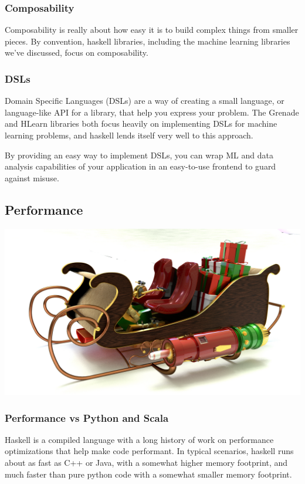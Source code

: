 \documentclass{beamer}
\begin{document}
\begin{frame}
  \frametitle{Composability}
  Composability is really about how easy it is to build complex things
  from smaller pieces.  By convention, haskell libraries, including
  the machine learning libraries we've discussed, focus on
  composability.
\end{frame}

\begin{frame}
  \frametitle{DSLs}
  Domain Specific Languages (DSLs) are a way of creating a small
  language, or language-like API for a library, that help you express
  your problem.  The Grenade and HLearn libraries both focus heavily
  on implementing DSLs for machine learning problems, and haskell
  lends itself very well to this approach.

  By providing an easy way to implement DSLs, you can wrap ML and data
  analysis capabilities of your application in an easy-to-use frontend
  to guard against misuse.
\end{frame}

\subsection{Performance}

\begin{frame}[fragile]
  \begin{center}
    \includegraphics[width=.85\paperwidth]{images/santa.jpg}
  \end{center}
\end{frame}

\begin{frame}
  \frametitle{Performance vs Python and Scala}
  Haskell is a compiled language with a long history of work on
  performance optimizations that help make code performant.  In
  typical scenarios, haskell runs about as fast as C++ or Java, with a
  somewhat higher memory footprint, and much faster than pure python
  code with a somewhat smaller memory footprint.
\end{frame}
\end{document}
